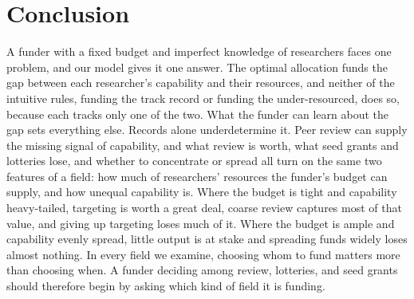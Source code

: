 \documentclass[article, 11pt, reqno]{amsart}
\theoremstyle{named}
\begin{document}
\section{Conclusion}\label{sec:conclusion}

A funder with a fixed budget and imperfect knowledge of researchers faces one problem, and our model gives it one answer. The optimal allocation funds the gap between each researcher's capability and their resources, and neither of the intuitive rules, funding the track record or funding the under-resourced, does so, because each tracks only one of the two. What the funder can learn about the gap sets everything else. Records alone underdetermine it. Peer review can supply the missing signal of capability, and what review is worth, what seed grants and lotteries lose, and whether to concentrate or spread all turn on the same two features of a field: how much of researchers' resources the funder's budget can supply, and how unequal capability is. Where the budget is tight and capability heavy-tailed, targeting is worth a great deal, coarse review captures most of that value, and giving up targeting loses much of it. Where the budget is ample and capability evenly spread, little output is at stake and spreading funds widely loses almost nothing. In every field we examine, choosing whom to fund matters more than choosing when. A funder deciding among review, lotteries, and seed grants should therefore begin by asking which kind of field it is funding.

\begin{appendices}




\end{appendices}



\end{document}

